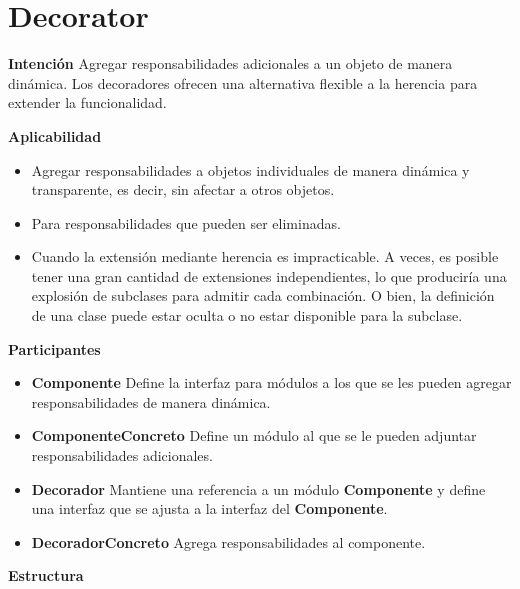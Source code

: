 \section{Decorator}

\textbf{Intención}
Agregar responsabilidades adicionales a un objeto de manera dinámica. Los decoradores ofrecen una alternativa flexible a la herencia para extender la funcionalidad.

\textbf{Aplicabilidad}
\begin{itemize}
\item Agregar responsabilidades a objetos individuales de manera dinámica y transparente, es decir, sin afectar a otros objetos.
\item Para responsabilidades que pueden ser eliminadas.
\item Cuando la extensión mediante herencia es impracticable. A veces, es posible tener una gran cantidad de extensiones independientes, lo que produciría una explosión de subclases para admitir cada combinación. O bien, la definición de una clase puede estar oculta o no estar disponible para la subclase.
\end{itemize}

\textbf{Participantes}
\begin{itemize}
\item \textbf{Componente} Define la interfaz para módulos a los que se les pueden agregar responsabilidades de manera dinámica.
\item \textbf{ComponenteConcreto} Define un módulo al que se le pueden adjuntar responsabilidades adicionales.
\item \textbf{Decorador} Mantiene una referencia a un módulo \textbf{Componente} y define una interfaz que se ajusta a la interfaz del \textbf{Componente}.
\item \textbf{DecoradorConcreto} Agrega responsabilidades al componente.
\end{itemize}


\textbf{Estructura}

